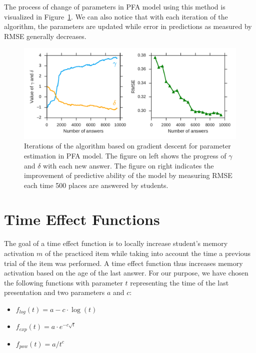 The process of change of parameters in PFA model using this method is visualized in Figure~\ref{gradient-descent-iterations}. We can also notice that with each iteration of the algorithm, the parameters are updated while error in predictions as measured by RMSE generally decreases.

\begin{figure}[htbp]
  \centering
  \includegraphics[width=\textwidth]{img/gradient-descent-iterations}
  \caption{Iterations of the algorithm based on gradient descent for parameter estimation in PFA model. The figure on left shows the progress of $\gamma$ and $\delta$ with each new answer. The figure on right indicates the improvement of predictive ability of the model by measuring RMSE each time 500 places are answered by students.}
  \label{gradient-descent-iterations}
\end{figure}

\section{Time Effect Functions}
\label{time-effect-functions}

The goal of a time effect function is to locally increase student's memory activation $m$ of the practiced item while taking into account the time a previous trial of the item was performed. A time effect function thus increases memory activation based on the age of the last answer. For our purpose, we have chosen the following functions with parameter $t$ representing the time of the last presentation and two parameters $a$ and $c$:

\begin{itemize}
  \item $f_{\mathit{log}}(t) = a - c \cdot \log(t)$
  \item $f_{\mathit{exp}}(t) = a \cdot e^{-c \sqrt{t}}$
  \item $f_{\mathit{pow}}(t) = a / t^c$
\end{itemize}

